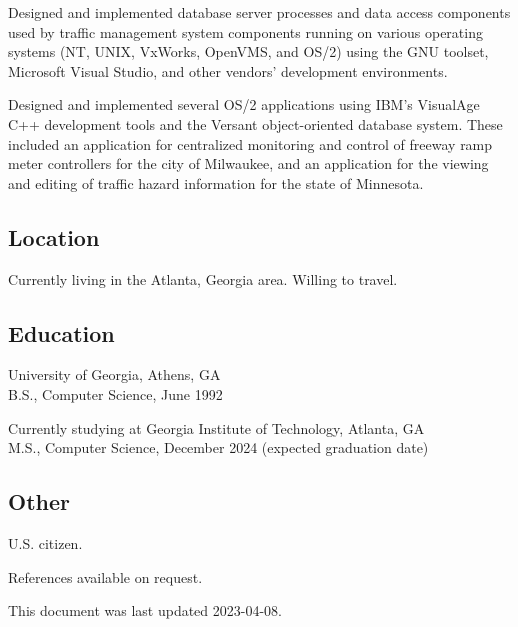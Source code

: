 Designed and implemented database server processes and data access
components used by traffic management system components running on
various operating systems (NT, UNIX, VxWorks, OpenVMS, and OS/2) using
the GNU toolset, Microsoft Visual Studio, and other vendors' development
environments.

Designed and implemented several OS/2 applications using IBM's VisualAge
C++ development tools and the Versant object-oriented database system.
These included an application for centralized monitoring and control of
freeway ramp meter controllers for the city of Milwaukee, and an
application for the viewing and editing of traffic hazard information
for the state of Minnesota.

\subsection{Location}\label{location}

Currently living in the Atlanta, Georgia area. Willing to travel.

\subsection{Education}\label{education}

University of Georgia, Athens, GA\\
B.S., Computer Science, June 1992

Currently studying at Georgia Institute of Technology, Atlanta, GA\\
M.S., Computer Science, December 2024 (expected graduation date)

\subsection{Other}\label{other}

U.S. citizen.

References available on request.

This document was last updated 2023-04-08.
